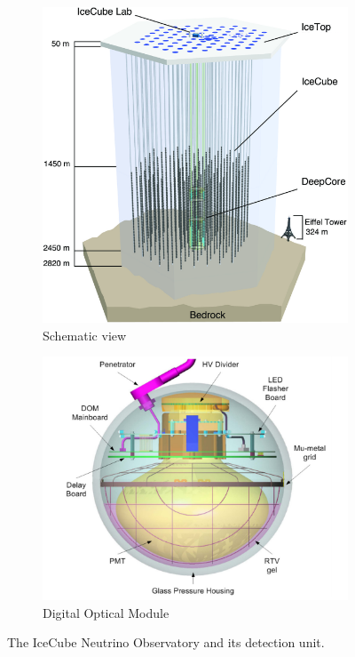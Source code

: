 \documentclass[../Main.tex]{subfiles}
\begin{document}
\begin{figure}[bth]
  \centering
  \hspace*{\fill}
  \begin{subfigure}[c]{0.48\textwidth}
    \centering
    \includegraphics[width=\textwidth]{IceCubeNoLabels}
    \caption{Schematic view}
    \label{fig:ICdiagram}
  \end{subfigure}
  \begin{subfigure}[c]{0.5\textwidth}
    \centering
    \includegraphics[width=\textwidth]{DOM}
    \caption{Digital Optical Module}
    \label{fig:DOM}
  \end{subfigure}
  \caption[The IceCube Neutrino Observatory.]{The IceCube Neutrino Observatory and its detection unit.}
  \label{fig:ICFigure}
\end{figure}
\end{document}
